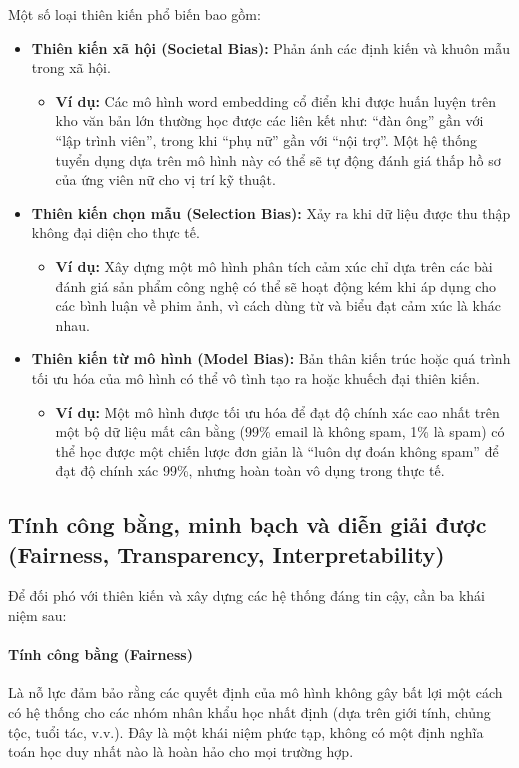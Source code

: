 Một số loại thiên kiến phổ biến bao gồm:
\begin{itemize}
    \item \textbf{Thiên kiến xã hội (Societal Bias):} Phản ánh các định kiến và khuôn mẫu trong xã hội.
        \begin{itemize}
            \item \textbf{Ví dụ:} Các mô hình word embedding cổ điển khi được huấn luyện trên kho văn bản lớn thường học được các liên kết như: “đàn ông” gần với “lập trình viên”, trong khi “phụ nữ” gần với “nội trợ”. Một hệ thống tuyển dụng dựa trên mô hình này có thể sẽ tự động đánh giá thấp hồ sơ của ứng viên nữ cho vị trí kỹ thuật.
        \end{itemize}
    \item \textbf{Thiên kiến chọn mẫu (Selection Bias):} Xảy ra khi dữ liệu được thu thập không đại diện cho thực tế.
        \begin{itemize}
            \item \textbf{Ví dụ:} Xây dựng một mô hình phân tích cảm xúc chỉ dựa trên các bài đánh giá sản phẩm công nghệ có thể sẽ hoạt động kém khi áp dụng cho các bình luận về phim ảnh, vì cách dùng từ và biểu đạt cảm xúc là khác nhau.
        \end{itemize}
    \item \textbf{Thiên kiến từ mô hình (Model Bias):} Bản thân kiến trúc hoặc quá trình tối ưu hóa của mô hình có thể vô tình tạo ra hoặc khuếch đại thiên kiến.
        \begin{itemize}
            \item \textbf{Ví dụ:} Một mô hình được tối ưu hóa để đạt độ chính xác cao nhất trên một bộ dữ liệu mất cân bằng (99\% email là không spam, 1\% là spam) có thể học được một chiến lược đơn giản là “luôn dự đoán không spam” để đạt độ chính xác 99\%, nhưng hoàn toàn vô dụng trong thực tế.
        \end{itemize}
\end{itemize}

\subsection{Tính công bằng, minh bạch và diễn giải được (Fairness, Transparency, Interpretability)}
\label{ssec:fairness_transparency_interpretability}

Để đối phó với thiên kiến và xây dựng các hệ thống đáng tin cậy, cần ba khái niệm sau:

\paragraph{Tính công bằng (Fairness)}
Là nỗ lực đảm bảo rằng các quyết định của mô hình không gây bất lợi một cách có hệ thống cho các nhóm nhân khẩu học nhất định (dựa trên giới tính, chủng tộc, tuổi tác, v.v.). Đây là một khái niệm phức tạp, không có một định nghĩa toán học duy nhất nào là hoàn hảo cho mọi trường hợp.

